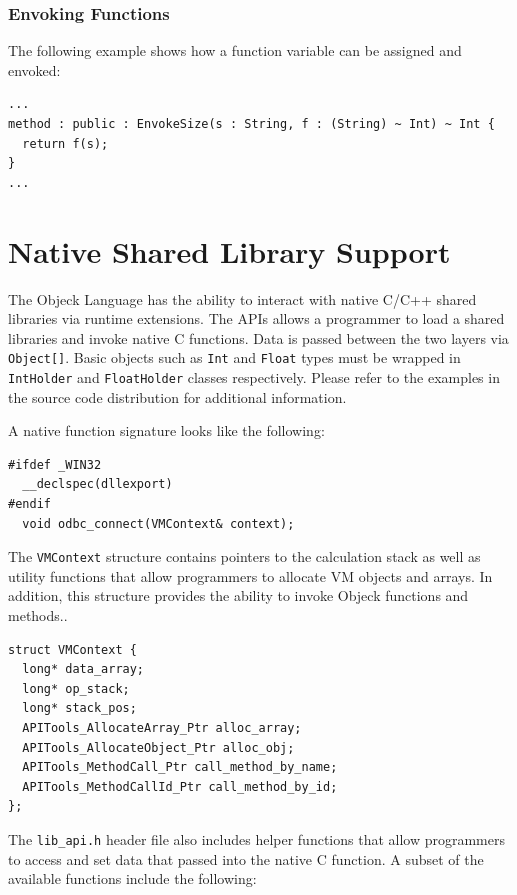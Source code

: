 \documentclass[11pt]{article}
\begin{document}
\subsubsection{Envoking Functions}
The following example shows how a function variable can be assigned
and envoked:
\begin{verbatim}
...
method : public : EnvokeSize(s : String, f : (String) ~ Int) ~ Int {
  return f(s);
}
...
\end{verbatim}

\section{Native Shared Library Support}
The Objeck Language has the ability to interact with native C/C++
shared libraries via runtime extensions.  The APIs allows a programmer
to load a shared libraries and invoke native C functions.  Data is
passed between the two layers via \texttt{Object[]}.  Basic objects
such as \texttt{Int} and \texttt{Float} types must be wrapped in
\texttt{IntHolder} and \texttt{FloatHolder} classes respectively.
Please refer to the examples in the source code distribution for
additional information.

A native function signature looks like the following:
\begin{verbatim}
#ifdef _WIN32
  __declspec(dllexport)
#endif
  void odbc_connect(VMContext& context);
\end{verbatim}

The \texttt{VMContext} structure contains pointers to the calculation
stack as well as utility functions that allow programmers to allocate
VM objects and arrays.  In addition, this structure provides the
ability to invoke Objeck functions and methods..

\begin{verbatim}
struct VMContext {
  long* data_array;
  long* op_stack;
  long* stack_pos;
  APITools_AllocateArray_Ptr alloc_array;
  APITools_AllocateObject_Ptr alloc_obj;
  APITools_MethodCall_Ptr call_method_by_name;
  APITools_MethodCallId_Ptr call_method_by_id;
};
\end{verbatim}

The \texttt{lib\_api.h} header file also includes helper functions
that allow programmers to access and set data that passed into the
native C function.  A subset of the available functions include the
following:
\end{document}

